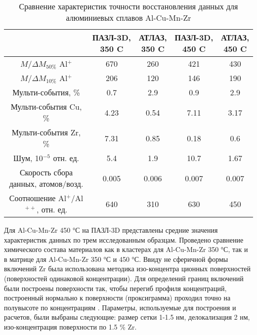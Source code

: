 \begin{table} [htbp]
	\centering
	\caption{Сравнение характеристик точности восстановления данных для алюминиевых сплавов Al-Cu-Mn-Zr}
	\label{tab:paramsAPPLEvsATLAS}
	\begin{SingleSpace}
		\begin{tabular} {| c | c | c | c | c |}
			\hline
			    {} & \thead{ПАЗЛ-3D, \\350 \textdegree C} & \thead{АТЛАЗ, \\350 \textdegree C} & \thead{ПАЗЛ-3D, \\450 \textdegree C} & \thead{АТЛАЗ, \\450 \textdegree C} \\ \hline
			$M/\Delta M_{50\%}$ Al$^+$ & 670  & 260  & 421  & 430               \\ \hline
			$M/\Delta M_{10\%}$ Al$^+$ & 206  & 120  & 146  & 190               \\ \hline
			Мульти-события, \%         & 0.7  & 2.9  & 0.9  & 2.9               \\ \hline
			Мульти-события Cu, \%      & 4.23 & 0.54 & 7.11 & 3.17              \\ \hline
			Мульти-события Zr, \%      & 7.31 & 0.85 & 0.18 & 0.6               \\ \hline
			Шум, 10$^{-5}$ отн. ед. & 5.4   & 1.9   & 10.7  & 1.67  \\ \hline
			Скорость сбора данных, атомов/возд.        & 0.005 & 0.006 & 0.007 & 0.007 \\ \hline
			Соотношение Al$^+$/Al$^{++}$, отн. ед.    & 640   & 310   & 630   & 450   \\ \hline
		\end{tabular}
	\end{SingleSpace}
\end{table}

Для Al-Cu-Mn-Zr 450 °С на ПАЗЛ-3D представлены средние значения характеристик данных по трем исследованным образцам. Проведено сравнение химического состава материалов как в кластерах для Al-Cu-Mn-Zr 350 °С, так и в матрице для Al-Cu-Mn-Zr 350 °С и 450 °С. Ввиду не сферичной формы включений Zr была использована методика изо-концентра ционных поверхностей (поверхностей одинаковой концентрации). Для определений границ включений были построены поверхности так, чтобы перегиб профиля концентраций, построенный нормально к поверхности (проксиграмма) проходил точно на полувысоте по концентрациям \cite{Hellman07}. Параметры, используемые для построения и расчетов, были выбраны следующие: размер сетки 1-1.5 нм, делокализация 2 нм, изо-концентрация поверхности по 1.5 \% Zr. 

